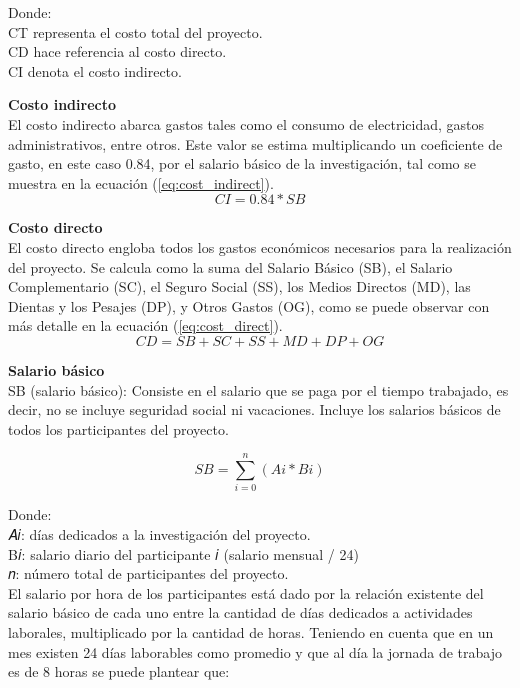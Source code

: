 Donde: \\
CT representa el costo total del proyecto. \\
CD hace referencia al costo directo. \\
CI denota el costo indirecto.

\textbf{Costo indirecto}\\
El costo indirecto abarca gastos tales como el consumo de electricidad, gastos administrativos, entre otros.
Este valor se estima multiplicando un coeficiente de gasto, en este caso 0.84, por el salario básico de la
investigación, tal como se muestra en la ecuación (\ref{eq:cost_indirect}). \\

\begin{equation}
    \label{eq:cost_indirect}
    CI = 0.84 * SB
\end{equation}

\textbf{Costo directo}\\
El costo directo engloba todos los gastos económicos necesarios para la realización del proyecto. Se
calcula como la suma del Salario Básico (SB), el Salario Complementario (SC), el Seguro Social (SS), los
Medios Directos (MD), las Dientas y los Pesajes (DP), y Otros Gastos (OG), como se puede observar con más
detalle en la ecuación (\ref{eq:cost_direct}). \\

\begin{equation}
    \label{eq:cost_direct}
    CD = SB + SC + SS + MD + DP + OG
\end{equation}

\textbf{Salario básico}\\
SB (salario básico): Consiste en el salario que se paga por el tiempo trabajado, es decir, no se incluye seguridad social ni vacaciones. Incluye los salarios básicos de todos los participantes del proyecto.


\begin{equation}
    \label{eq:sal_basico}
    SB = \sum_{i = 0}^{n} (Ai * Bi)
\end{equation}

Donde:\\
𝐴𝑖: días dedicados a la investigación del proyecto.\\
B𝑖: salario diario del participante 𝑖 (salario mensual / 24)\\
𝑛: número total de participantes del proyecto.\\

El salario por hora de los participantes está dado por la relación existente del salario
básico de cada uno entre la cantidad de días dedicados a actividades laborales,
multiplicado por la cantidad de horas. Teniendo en cuenta que en un mes existen 24
días laborables como promedio y que al día la jornada de trabajo es de 8 horas se
puede plantear que:

